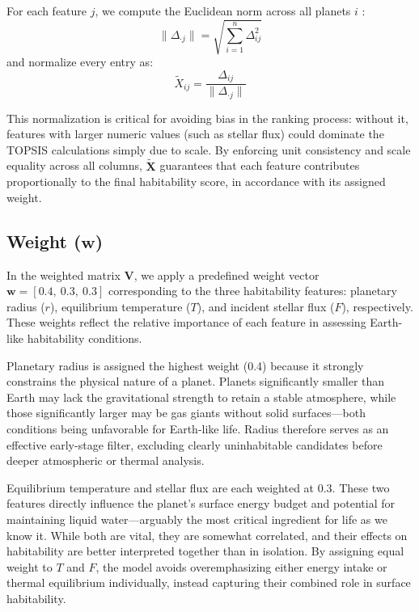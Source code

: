 \documentclass[12pt]{article}
\begin{document}
For each feature $j$, we compute the Euclidean norm across all planets $i$ :
\[
\|\Delta_{\cdot j}\| = \sqrt{ \sum_{i=1}^{n} \Delta_{ij}^2 }
\]
and normalize every entry as:\vspace{1em}
\begin{equation}
    \tilde{X}_{ij} = \frac{\Delta_{ij}}{ \|\Delta_{\cdot j}\| }
\end{equation}\vspace{1em}

This normalization is critical for avoiding bias in the ranking process: without it, features with larger numeric values (such as stellar flux) could dominate the TOPSIS calculations simply due to scale. By enforcing unit consistency and scale equality across all columns, $\tilde{\mathbf{X}}$ guarantees that each feature contributes proportionally to the final habitability score, in accordance with its assigned weight.


\subsection{ Weight (${\mathbf{w}}$)}\label{subsec: weight}
In the weighted matrix $\mathbf{V}$, we apply a predefined weight vector $\mathbf{w} = [0.4,\ 0.3,\ 0.3]$ corresponding to the three habitability features: planetary radius ($r$), equilibrium temperature ($T$), and incident stellar flux ($F$), respectively. These weights reflect the relative importance of each feature in assessing Earth-like habitability conditions.

Planetary radius is assigned the highest weight (0.4) because it strongly constrains the physical nature of a planet. Planets significantly smaller than Earth may lack the gravitational strength to retain a stable atmosphere, while those significantly larger may be gas giants without solid surfaces—both conditions being unfavorable for Earth-like life. Radius therefore serves as an effective early-stage filter, excluding clearly uninhabitable candidates before deeper atmospheric or thermal analysis.

Equilibrium temperature and stellar flux are each weighted at 0.3. These two features directly influence the planet's surface energy budget and potential for maintaining liquid water—arguably the most critical ingredient for life as we know it. While both are vital, they are somewhat correlated, and their effects on habitability are better interpreted together than in isolation. By assigning equal weight to $T$ and $F$, the model avoids overemphasizing either energy intake or thermal equilibrium individually, instead capturing their combined role in surface habitability.
\end{document}
